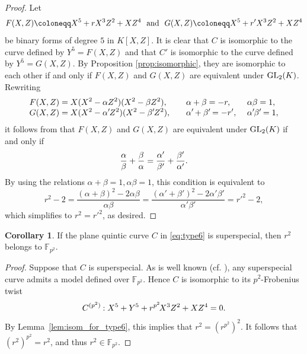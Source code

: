 \documentclass{article}
\theoremstyle{definition}
\newtheorem{Cor}[Def]{Corollary}
\begin{document}
\begin{proof}
Let\vspace{-0.5mm}
\[
    F(X,Z) \coloneqq X^5+rX^3Z^2+XZ^4 \ \text{ and }\ G(X,Z) \coloneqq X^5+r'X^3Z^2+XZ^4\vspace{0.7mm}
\]
be binary forms of degree $5$ in $K[X,Z]$.
It is clear that $C$ is isomorphic to the curve defined by $Y^5 = F(X,Z)$ and that $C'$ is isomorphic to the curve defined by $Y^5 = G(X,Z)$.
By Proposition \ref{prop:isomorphic}, they are isomorphic to\\ each other if and only if $F(X,Z)$ and $G(X,Z)$ are equivalent under ${\rm GL}_2(K)$.
Rewriting\vspace{-0.8mm}
\begin{alignat*}{3}
    F(X,Z) &= X(X^2-\alpha Z^2)(X^2-\beta Z^2), & \quad & \alpha+\beta =-r,&\ &\alpha\beta = 1,\\[-1.3mm]
    G(X,Z) &= X(X^2-\alpha'\hspace{-0.3mm}Z^2)(X^2-\beta'\hspace{-0.3mm}Z^2), & \quad & \alpha'\hspace{-0.3mm}+\beta'\hspace{-0.3mm} =-r', &\ & \alpha'\hspace{-0.3mm}\beta'\hspace{-0.3mm} = 1,
\end{alignat*}
it follows from \cite[Corollary 2.1.1]{Ishii} that $F(X,Z)$ and $G(X,Z)$ are equivalent under ${\rm GL}_2(K)$ if and only if\vspace{-0.8mm}
\[
    \frac{\alpha}{\beta} + \frac{\beta}{\alpha} = \frac{\alpha'}{\beta'} + \frac{\beta'}{\alpha'}.\vspace{-0.7mm}
\]
By using the relations $\alpha+\beta=1, \alpha\beta=1$, this condition is equivalent to\vspace{-1mm}
\[
    r^2-2 = \frac{(\alpha+\beta)^2-2\alpha\beta}{\alpha\beta} = \frac{(\alpha'+\beta')^2-2\alpha'\beta'}{\alpha'\beta'} = r'^2-2,
\]
which simplifies to $r^2 = r'^2$, as desired.\vspace{-1.3mm}
\end{proof}
\begin{Cor}\label{cor:rational-type6}
If the plane quintic curve $C$ in \eqref{eq:type6} is superspecial, then $r^2$ belongs to $\mathbb{F}_{p^2}$.\vspace{-1.2mm}
\end{Cor}
\begin{proof}
Suppose that $C$ is superspecial.
As is well known (cf. \cite[Theorem 1.1]{Ekedahl}), any superspecial curve admits a model defined over $\mathbb{F}_{p^2}$.
Hence $C$ is isomorphic to its $p^2$-Frobenius twist\vspace{-1.3mm}
\[
    C^{(p^2)}\hspace{-0.2mm}: X^5+Y^5+r^{p^2}\hspace{-0.5mm}X^3Z^2 +XZ^4 = 0.\vspace{0.4mm}
\]
By Lemma~\ref{lem:isom_for_type6}, this implies that $r^2 = (r^{p^2})^2$.
It follows that $(r^2)^{p^2} = r^2$, and thus $r^2 \in \mathbb{F}_{p^2}$.
\end{proof}
\end{document}
